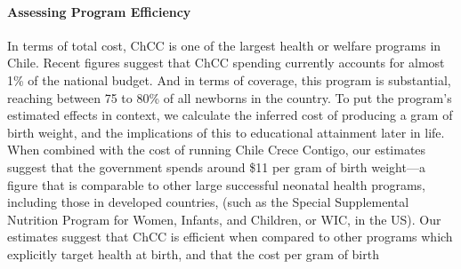\documentclass[12pt]{article}
\begin{document}
\begin{spacing}{1.4}

\paragraph{Assessing Program Efficiency}
In terms of total cost, ChCC is one of the largest health or welfare
programs in Chile.  Recent figures suggest that ChCC spending currently
accounts for almost 1\% of the national budget. And in terms of coverage,
this program is substantial, reaching between 75 to 80\% of all
newborns in the country.
To put the program's estimated effects in context, we calculate the inferred cost
of producing a gram of birth weight, and the implications of this to
educational attainment later in life.  When combined with the cost of
running Chile Crece Contigo, our estimates suggest that the government
spends around \$11 per gram of birth weight---a figure that is comparable
to other large successful neonatal health programs, including those in
developed countries, (such as the Special Supplemental Nutrition Program
for Women, Infants, and Children, or WIC, in the US).  Our estimates
suggest that ChCC is efficient when compared to other programs which
explicitly target health at birth, and that the cost per gram of birth

\end{spacing}
\end{document}
